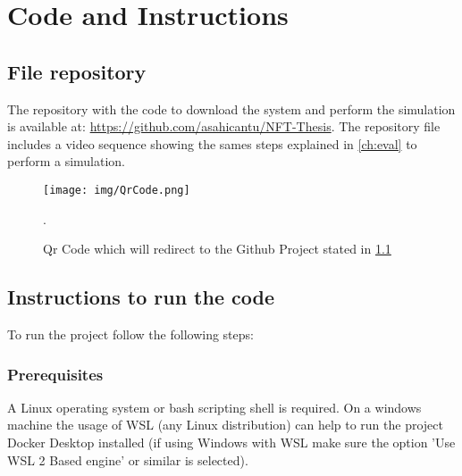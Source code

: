 \chapter{Code and Instructions}
\label{apx:main}

\section{File repository}
\label{FileRep}
The repository with the code to download the system and perform the simulation is available at:
\url{https://github.com/asahicantu/NFT-Thesis}.
The repository file includes a video sequence showing the sames steps explained in \ref{ch:eval} to perform a simulation.

 \begin{figure}[!h]
        \centering
        \texttt{[image: img/QrCode.png]}
        \caption{Qr Code which will redirect to the Github Project stated in \ref{FileRep}}.
        \label{fig:QRCode}
\end{figure}

\section{Instructions to run the code}
To run the project follow the following steps:

\subsection{Prerequisites}
A Linux operating system or bash scripting shell is required.
On a windows machine the usage of \ac{WSL} (any Linux distribution) can help to run the project
Docker Desktop installed (if using Windows with \ac{WSL} make sure the option 'Use WSL 2 Based engine' or similar is selected).

